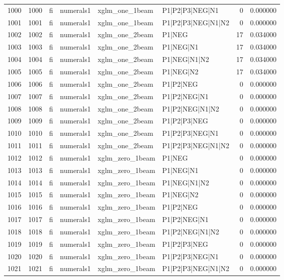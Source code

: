 \begin{tabular}{lrllllrr}
1000 & 1000 & fi & numerals1 & xglm_one_1beam & P1|P2|P3|NEG|N1 & 0 & 0.000000 \\
1001 & 1001 & fi & numerals1 & xglm_one_1beam & P1|P2|P3|NEG|N1|N2 & 0 & 0.000000 \\
1002 & 1002 & fi & numerals1 & xglm_one_2beam & P1|NEG & 17 & 0.034000 \\
1003 & 1003 & fi & numerals1 & xglm_one_2beam & P1|NEG|N1 & 17 & 0.034000 \\
1004 & 1004 & fi & numerals1 & xglm_one_2beam & P1|NEG|N1|N2 & 17 & 0.034000 \\
1005 & 1005 & fi & numerals1 & xglm_one_2beam & P1|NEG|N2 & 17 & 0.034000 \\
1006 & 1006 & fi & numerals1 & xglm_one_2beam & P1|P2|NEG & 0 & 0.000000 \\
1007 & 1007 & fi & numerals1 & xglm_one_2beam & P1|P2|NEG|N1 & 0 & 0.000000 \\
1008 & 1008 & fi & numerals1 & xglm_one_2beam & P1|P2|NEG|N1|N2 & 0 & 0.000000 \\
1009 & 1009 & fi & numerals1 & xglm_one_2beam & P1|P2|P3|NEG & 0 & 0.000000 \\
1010 & 1010 & fi & numerals1 & xglm_one_2beam & P1|P2|P3|NEG|N1 & 0 & 0.000000 \\
1011 & 1011 & fi & numerals1 & xglm_one_2beam & P1|P2|P3|NEG|N1|N2 & 0 & 0.000000 \\
1012 & 1012 & fi & numerals1 & xglm_zero_1beam & P1|NEG & 0 & 0.000000 \\
1013 & 1013 & fi & numerals1 & xglm_zero_1beam & P1|NEG|N1 & 0 & 0.000000 \\
1014 & 1014 & fi & numerals1 & xglm_zero_1beam & P1|NEG|N1|N2 & 0 & 0.000000 \\
1015 & 1015 & fi & numerals1 & xglm_zero_1beam & P1|NEG|N2 & 0 & 0.000000 \\
1016 & 1016 & fi & numerals1 & xglm_zero_1beam & P1|P2|NEG & 0 & 0.000000 \\
1017 & 1017 & fi & numerals1 & xglm_zero_1beam & P1|P2|NEG|N1 & 0 & 0.000000 \\
1018 & 1018 & fi & numerals1 & xglm_zero_1beam & P1|P2|NEG|N1|N2 & 0 & 0.000000 \\
1019 & 1019 & fi & numerals1 & xglm_zero_1beam & P1|P2|P3|NEG & 0 & 0.000000 \\
1020 & 1020 & fi & numerals1 & xglm_zero_1beam & P1|P2|P3|NEG|N1 & 0 & 0.000000 \\
1021 & 1021 & fi & numerals1 & xglm_zero_1beam & P1|P2|P3|NEG|N1|N2 & 0 & 0.000000 \\

\end{tabular}
